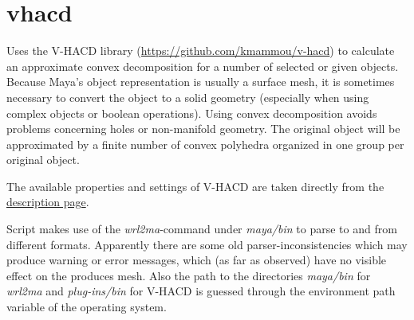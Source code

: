\documentclass[letterpaper,10pt,english]{sphinxmanual}
\begin{document}
\section{vhacd}
\label{pk_src.vhacd:vhacd}\label{pk_src.vhacd::doc}\label{pk_src.vhacd:id1}
{\hyperref[index:commands]{}}
\label{pk_src.vhacd:module-pk_src.vhacd}
Uses the V-HACD library (\url{https://github.com/kmammou/v-hacd}) to calculate an approximate convex decomposition for a number of selected or given objects. Because Maya's object representation is usually a surface mesh, it is sometimes necessary to convert the object to a solid geometry (especially when using complex objects or boolean operations). Using convex decomposition avoids problems concerning holes or non-manifold geometry. The original object will be approximated by a finite number of convex polyhedra organized in one group per original object.

The available properties and settings of V-HACD are taken directly from the \href{http://kmamou.blogspot.de/2014/12/v-hacd-20-parameters-description.html}{description page}.

Script makes use of the \emph{wrl2ma}-command under \emph{maya/bin} to parse to and from different formats. Apparently there are some old parser-inconsistencies which may produce warning or error messages, which (as far as observed) have no visible effect on the produces mesh. Also the path to the directories \emph{maya/bin} for \emph{wrl2ma} and \emph{plug-ins/bin} for V-HACD is guessed through the environment path variable of the operating system.
\end{document}
